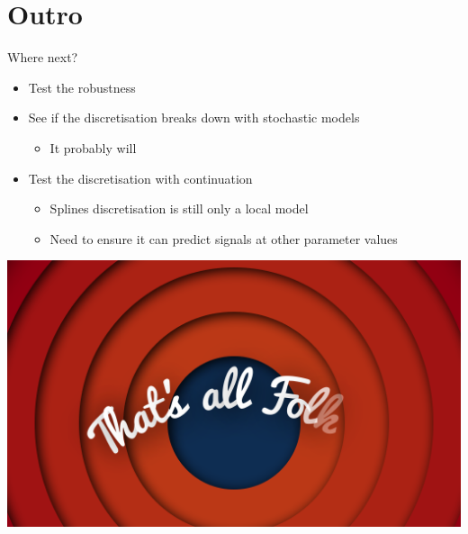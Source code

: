 \documentclass[presentation]{beamer}
\begin{document}
\section{Outro}
\label{sec:org50a2f9a}
\begin{frame}[label={sec:orgf2700af}]{Where next?}
\begin{itemize}
\item Test the robustness
\item See if the discretisation breaks down with stochastic models
\begin{itemize}
\item It probably will
\end{itemize}
\item Test the discretisation with continuation
\begin{itemize}
\item Splines discretisation is still only a local model
\item Need to ensure it can predict signals at other parameter values
\end{itemize}
\end{itemize}
\end{frame}
\begin{frame}[label={sec:org4876568}]{}
\begin{center}
\includegraphics[width=.9\linewidth]{./end.png}
\end{center}
\end{frame}
\end{document}
